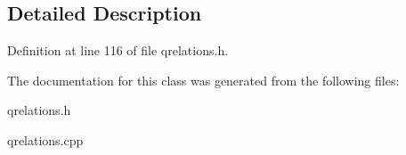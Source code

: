 \subsection{Detailed Description}


Definition at line 116 of file qrelations.\+h.



The documentation for this class was generated from the following files\+:\begin{DoxyCompactItemize}
\item 
qrelations.\+h\item 
qrelations.\+cpp\end{DoxyCompactItemize}
